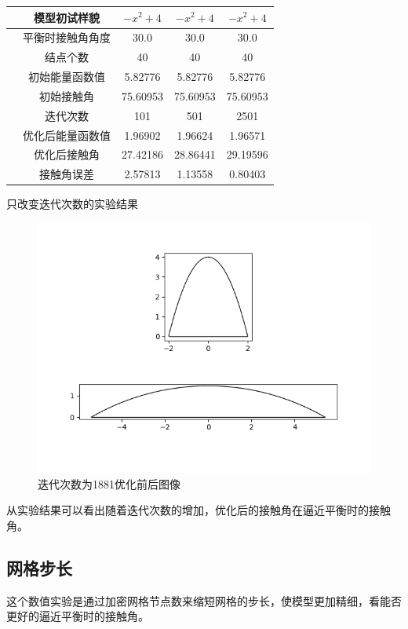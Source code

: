 \documentclass[12pt,oneside,a4paper]{article}
\begin{document}
\begin{center}
\renewcommand\arraystretch{2.2}
\begin{tabular}{|c|c|c|c|}
\hline 
\rule[-1ex]{0pt}{2.5ex}　模型初试样貌 & $-x^2+4$ & $-x^2+4$ & $-x^2+4$ \\ 
\hline 
\rule[-1ex]{0pt}{2.5ex}　平衡时接触角角度 & 30.0 & 30.0 & 30.0 \\ 
\hline 
\rule[-1ex]{0pt}{2.5ex}　结点个数 & 40 & 40 & 40 \\ 
\hline 
\rule[-1ex]{0pt}{2.5ex}　初始能量函数值 & 5.82776 & 5.82776 & 5.82776 \\ 
\hline 
\rule[-1ex]{0pt}{2.5ex}　初始接触角 & 75.60953 & 75.60953 & 75.60953 \\ 
\hline 
\rule[-1ex]{0pt}{2.5ex}　迭代次数 & 101 & 501 & 2501 \\ 
\hline 
\rule[-1ex]{0pt}{2.5ex}　优化后能量函数值 & 1.96902 & 1.96624 & 1.96571 \\ 
\hline 
\rule[-1ex]{0pt}{2.5ex}　优化后接触角 & 27.42186 & 28.86441 & 29.19596 \\ 
\hline 
\rule[-1ex]{0pt}{2.5ex}　接触角误差 & 2.57813 & 1.13558 & 0.80403 \\ 
\hline 
\end{tabular} 
\centerline{只改变迭代次数的实验结果}
\end{center}
\begin{figure}[H]
	\centering
	\includegraphics[width=0.7\linewidth]{figure/nit-p.png}
	\caption{迭代次数为1881优化前后图像}
	\label{fig:5}
\end{figure}
从实验结果可以看出随着迭代次数的增加，优化后的接触角在逼近平衡时的接触角。

\newpage

\subsection{网格步长}
这个数值实验是通过加密网格节点数来缩短网格的步长，使模型更加精细，看能否更好的逼近平衡时的接触角。
\end{document}

